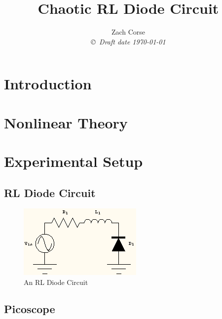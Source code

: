 \documentclass[12pt]{report}
\title{Chaotic RL Diode Circuit}
\author{Zach Corse  \\
{\small\em \copyright \  Draft date \today }}
\date{ }
\begin{document}



\tableofcontents
\listoffigures
\listoftables

\pagestyle{headings}

\pagestyle{plain}

\chapter{Introduction}



\chapter{Nonlinear Theory}



\chapter{Experimental Setup}

\section{RL Diode Circuit}
\label{sec:RL Diode Circuit}


\begin{figure}
	\centering
	\includegraphics{Pics/circuit.png}
	\caption{An RL Diode Circuit}
	\label{fig:circuit}
\end{figure}

\section{Picoscope}
\label{sec:Picoscope}

\end{document}
